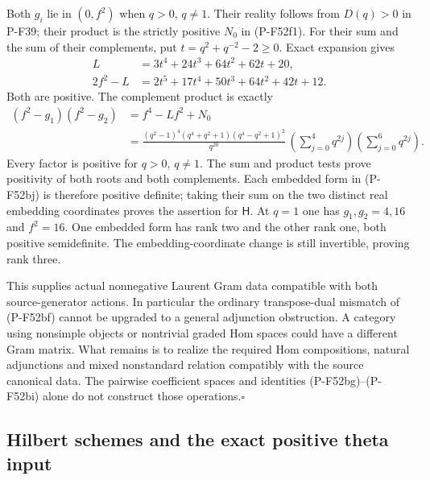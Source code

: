 \documentclass[11pt,a4paper]{article}
\begin{document}
Both $g_i$ lie in $(0,f^2)$ when $q>0$, $q\ne1$.
Their reality follows from $D(q)>0$ in P-F39; their
product is the strictly positive $N_0$ in (P-F52f1).
For their sum and the sum of their complements, put
$t=q^2+q^{-2}-2\ge0$. Exact expansion gives
\[
 \begin{split}
 L&=3t^4+24t^3+64t^2+62t+20,\\
 2f^2-L&=2t^5+17t^4+50t^3+64t^2+42t+12.
 \end{split}                                                    \tag{P-F52bk}
\]
Both are positive. The complement product is exactly
\[
 \begin{split}
 (f^2-g_1)(f^2-g_2)
 &=f^4-Lf^2+N_0\\
 &=\frac{(q^2-1)^4(q^4+q^2+1)(q^4-q^2+1)^2}{q^{20}}\,
       \left(\sum_{j=0}^4q^{2j}\right)
       \left(\sum_{j=0}^6q^{2j}\right).
 \end{split}                                                    \tag{P-F52bl}
\]
Every factor is positive for $q>0$, $q\ne1$.
The sum and product tests prove positivity of both
roots and both complements. Each embedded form in
(P-F52bj) is therefore positive definite; taking their
sum on the two distinct real embedding coordinates
proves the assertion for $\mathsf H$.
At $q=1$ one has $g_1,g_2=4,16$ and $f^2=16$.
One embedded form has rank two and the other rank one,
both positive semidefinite. The embedding-coordinate
change is still invertible, proving rank three.

This supplies actual nonnegative Laurent Gram data
compatible with both source-generator actions.
In particular the ordinary transpose-dual mismatch of
(P-F52bf) cannot be upgraded to a general adjunction
obstruction. A category using nonsimple objects or
nontrivial graded Hom spaces could have a different
Gram matrix. What remains is to realize the required
Hom compositions, natural adjunctions and mixed
nonstandard relation compatibly with the source
canonical data. The pairwise coefficient spaces and
identities (P-F52bg)--(P-F52bi) alone do not construct
those operations.\hfill$\square$


\subsection{Hilbert schemes and the exact positive theta input}
\end{document}
